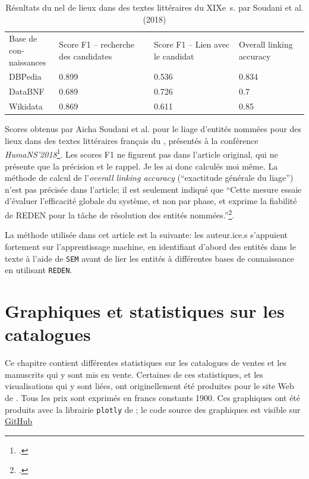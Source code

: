 \begin{table}[h]
	\centering
	\begin{tabular}{m{5cm}m{3cm}m{3cm}m{3cm}}
		\diagbox[innerwidth=5cm]{Score}{Base de con-\\naissances} & Score F1 -- recherche des candidates & Score F1 -- Lien avec le candidat & Overall linking accuracy \\
		DBPedia & 0.899 & 0.536 & 0.834 \\
		DataBNF & 0.689 & 0.726 & 0.7 \\
		Wikidata & 0.869 & 0.611 & 0.85 \\
	\end{tabular}
	\caption{Résultats du \gls{nel} de lieux dans des textes littéraires du XIXe~s. par Soudani et al. (2018)}
	\label{appendix:soudani}
\end{table}
Scores obtenus par Aicha Soudani et al. pour le liage d'entités nommées pour des lieux dans des textes littéraires français du , présentés à la conférence \textit{HumaNS’2018}\footcite[p. 4]{soudani_adaptation_2018}. Les scores F1 ne figurent pas dans l'article original, qui ne présente que la précision et le rappel. Je les ai donc calculés moi même. La méthode de calcul de l'\textit{overall linking accuracy} (\enquote{exactitude générale du liage}) n'est pas précisée dans l'article; il est seulement indiqué que \enquote{Cette mesure essaie d'évaluer l'efficacité globale du système, et non par phase, et exprime la fiabilité de REDEN pour la tâche de résolution des entités nommées.}\footcite[p. 4]{soudani_adaptation_2018}.

La méthode utilisée dans cet article est la suivante: les auteur.ice.s s'appuient fortement sur l'apprentissage machine, en identifiant d'abord des entités dans le texte à l'aide de \texttt{SEM} avant de lier les entités à différentes bases de connaissance en utilisant \texttt{REDEN}.

\chapter{Graphiques et statistiques sur les catalogues}
Ce chapitre contient différentes statistiques sur les catalogues de ventes et les manuscrits qui y sont mis en vente. Certaines de ces statistiques, et les visualisations qui y sont liées, ont originellement été produites pour le site Web de \ktb{}. Tous les prix sont exprimés en francs constants 1900. Ces graphiques ont été produits avec la librairie \texttt{plotly} de \py{}; le code source des graphiques est visible sur \href{https://github.com/katabase/visualisations}{GitHub}

